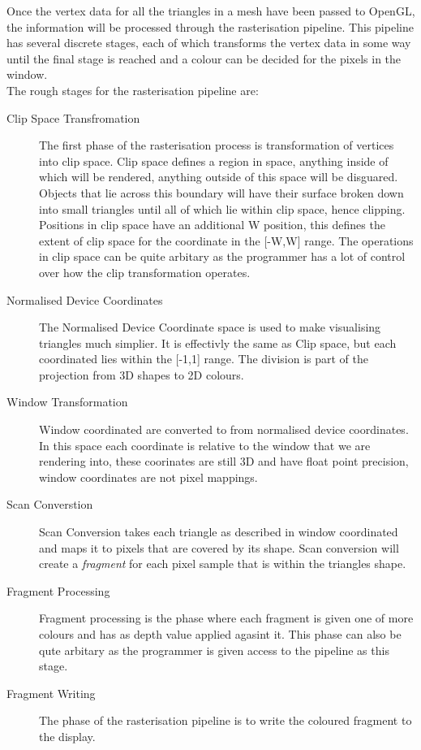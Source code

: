 Once the vertex data for all the triangles in a mesh have been passed to OpenGL,
the information will be processed through the rasterisation pipeline. This 
pipeline has several discrete stages, each of which transforms the vertex data 
in some way until the final stage is reached and a colour can be decided for the
pixels in the window.\\

The rough stages for the rasterisation pipeline are:
\begin{description}
\item[Clip Space Transfromation] The first phase of the rasterisation process
is transformation of vertices into clip space. Clip space defines a region in 
space, anything inside of which will be rendered, anything outside of this space
will be disguared. Objects that lie across this boundary will have their surface
broken down into small triangles until all of which lie within clip space, hence
clipping. Positions in clip space have an additional W position, this defines the
extent of clip space for the coordinate in the [-W,W] range.
The operations in clip space can be quite arbitary as the programmer 
has a lot of control over how the clip transformation operates.

\item[Normalised Device Coordinates] The Normalised Device Coordinate space is 
used to make visualising triangles much simplier. It is effectivly the same as 
Clip space, but each coordinated lies within the [-1,1] range. The division is 
part of the projection from 3D shapes to 2D colours.
\item[Window Transformation] Window coordinated are converted to from normalised
device coordinates. In this space each coordinate is relative to the window that
we are rendering into, these coorinates are still 3D and have float point 
precision, window coordinates are not pixel mappings.
\item[Scan Converstion] Scan Conversion takes each triangle as described in 
window coordinated and maps it to pixels that are covered by its shape. Scan 
conversion will create a \emph{fragment} for each pixel sample that is within
the triangles shape.
\item[Fragment Processing] Fragment processing is the phase where each fragment 
is given one of more colours and has as depth value applied agasint it. This 
phase can also be qute arbitary as the programmer is given access to the pipeline
as this stage.
\item[Fragment Writing] The phase of the rasterisation pipeline is to write the 
coloured fragment to the display.
\end{description}

